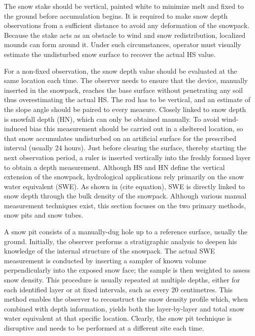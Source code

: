 The snow stake should be vertical, painted white to minimize melt and fixed to the ground before accumulation begins. It is required to make 
snow depth observations from a sufficient distance to avoid any deformation of the snowpack. Because the stake acts as an obstacle to wind and 
snow redistribution, localized mounds can form around it. Under such circumstances, operator must visually estimate the undisturbed snow surface 
to recover the actual HS value.

For a non-fixed observation, the snow depth value should be evaluated at the same location each time. The observer needs to ensure that the device, 
manually inserted in the snowpack, reaches the base surface without penetrating any soil thus overestimating the actual HS. The rod has to be 
vertical, and an estimate of the slope angle should be paired to every measure.
\newline
\newline
Closely linked to snow depth is snowfall depth (HN), which can only be obtained manually. To avoid wind-induced bias this measurement should 
be carried out in a sheltered location, so that snow accumulates undisturbed on an artificial surface for the prescribed interval (usually 24 hours). 
Just before clearing the surface, thereby starting the next observation period, a ruler is inserted vertically into the freshly formed layer to 
obtain a depth measurement.
\newline
\newline
Although HS and HN define the vertical extension of the snowpack, hydrological applications rely primarily on the snow water equivalent (SWE). 
As shown in (cite equation), SWE is directly linked to snow depth through the bulk density of the snowpack. Although various manual measurement 
techniques exist, this section focuses on the two primary methods, snow pits and snow tubes.

A snow pit consists of a manually-dug hole up to a reference surface, usually the ground. Initially, the observer performs a stratigraphic analysis 
to deepen his knowledge of the internal structure of the snowpack. The actual SWE measurement is conducted by inserting a sampler of known volume 
perpendicularly into the exposed snow face; the sample is then weighted to assess snow density. This procedure is usually repeated at multiple depths, 
either for each identified layer or at fixed intervals, such as every 20 centimetres. This method enables the observer to reconstruct the snow 
density profile which, when combined with depth information, yields both the layer-by-layer and total snow water equivalent at that specific 
location. Clearly, the snow pit technique is disruptive and needs to be performed at a different site each time.

